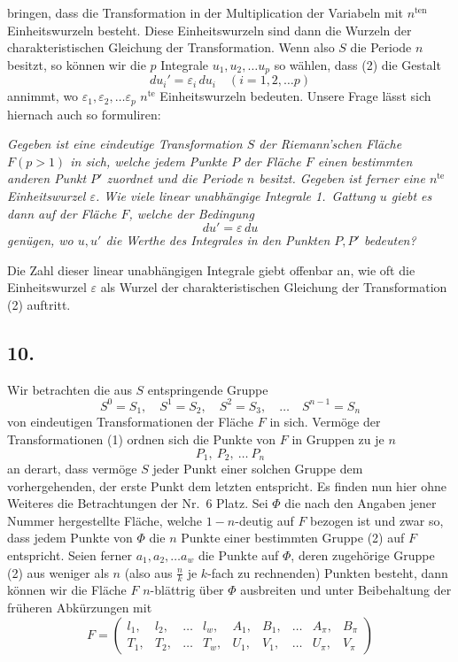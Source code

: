 \documentclass{article}
\begin{document}
bringen, dass die Transformation in der Multiplication der Variabeln mit $n^{\text{ten}}$ Einheitswurzeln besteht. Diese Einheitswurzeln sind dann die Wurzeln der charakteristischen Gleichung der Transformation. Wenn also $S$ die Periode $n$ besitzt, so können wir die $p$ Integrale $u_1, u_2, \dots u_p$ so wählen, dass (2) die Gestalt
\[
du_i' = \varepsilon_i\,du_i \quad (i = 1, 2, \dots p)
\tag{4}
\]
annimmt, wo $\varepsilon_1, \varepsilon_2, \dots \varepsilon_p$ $n^{\text{te}}$ Einheitswurzeln bedeuten. Unsere Frage lässt sich hiernach auch so formuliren:

\emph{Gegeben ist eine eindeutige Transformation $S$ der Riemann'schen Fläche $F(p > 1)$ in sich, welche jedem Punkte $P$ der Fläche $F$ einen bestimmten anderen Punkt $P'$ zuordnet und die Periode $n$ besitzt. Gegeben ist ferner eine $n^{\text{te}}$ Einheitswurzel $\varepsilon$. Wie viele linear unabhängige Integrale 1.~Gattung $u$ giebt es dann auf der Fläche $F$, welche der Bedingung}
\[
du' = \varepsilon\,du
\]
\emph{genügen, wo $u, u'$ die Werthe des Integrales in den Punkten $P, P'$ bedeuten?}

Die Zahl dieser linear unabhängigen Integrale giebt offenbar an, wie oft die Einheitswurzel $\varepsilon$ als Wurzel der charakteristischen Gleichung der Transformation (2) auftritt.

\subsection*{10.}

Wir betrachten die aus $S$ entspringende Gruppe
\[
S^0 = S_1, \quad S^1 = S_2, \quad S^2 = S_3, \quad \dots \quad S^{n-1} = S_n
\tag{1}
\]
von eindeutigen Transformationen der Fläche $F$ in sich. Vermöge der Transformationen (1) ordnen sich die Punkte von $F$ in Gruppen zu je $n$
\[
P_1, \ P_2, \ \dots \ P_n
\tag{2}
\]
an derart, dass vermöge $S$ jeder Punkt einer solchen Gruppe dem vorhergehenden, der erste Punkt dem letzten entspricht. Es finden nun hier ohne Weiteres die Betrachtungen der Nr.~6 Platz. Sei $\Phi$ die nach den Angaben jener Nummer hergestellte Fläche, welche $1-n$-deutig auf $F$ bezogen ist und zwar so, dass jedem Punkte von $\Phi$ die $n$ Punkte einer bestimmten Gruppe (2) auf $F$ entspricht. Seien ferner $a_1, a_2, \dots a_w$ die Punkte auf $\Phi$, deren zugehörige Gruppe (2) aus weniger als $n$ (also aus $\frac{n}{k}$ je $k$-fach zu rechnenden) Punkten besteht, dann können wir die Fläche $F$ $n$-blättrig über $\Phi$ ausbreiten und unter Beibehaltung der früheren Abkürzungen mit
\[
F = \begin{pmatrix}
l_1, & l_2, & \dots & l_w, & A_1, & B_1, & \dots & A_\pi, & B_\pi \\
T_1, & T_2, & \dots & T_w, & U_1, & V_1, & \dots & U_\pi, & V_\pi
\end{pmatrix}
\tag{3}
\]
\end{document}
